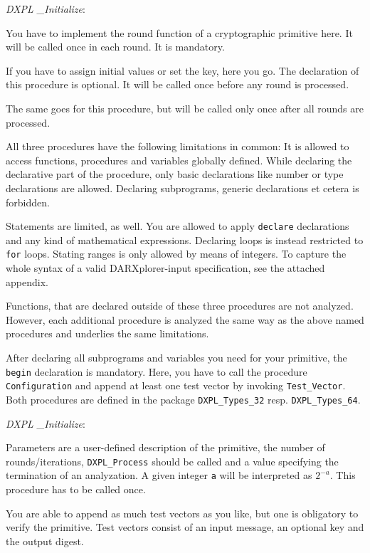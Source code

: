 \documentclass{acmtrans2m}
\begin{document}
\begin{describe}{{\em DXPL \_Initialize\/}:}
\item[{\texttt DXPL\_Process\/}:] You have to implement the round function
of a cryptographic primitive here. It will be called once in each round. It is mandatory.

\item[\texttt{DXPL\_Initialize\/}:] If you have to assign initial values or set the key, here you go. The declaration of this procedure is optional. It will be called once before any round is processed.

\item[\texttt{DXPL\_Finalize\/}:] The same goes for this procedure, but will be called only once after
all rounds are processed.
\end{describe}

All three procedures have the following limitations in common: It is allowed to 
access functions, procedures and variables globally defined. While declaring 
the declarative part of the procedure, only basic declarations like number or 
type declarations are allowed. Declaring subprograms, generic declarations 
et cetera is forbidden.

Statements are limited, as well. You are allowed to apply \texttt{declare} declarations
and any kind of mathematical expressions. Declaring loops is instead restricted
to \texttt{for} loops. Stating ranges is only allowed by means of integers. To capture the whole
syntax of a valid DARXplorer-input specification, see the attached appendix.

Functions, that are declared outside of these three procedures are not analyzed.
However, each additional procedure is analyzed the same way as the above named procedures
and underlies the same limitations.

\bigbreak

After declaring all subprograms and variables you need for your primitive, the \texttt{begin}
declaration is mandatory. Here, you have to call the procedure \texttt{Configu\-ra\-tion} and
append at least one test vector by invoking \texttt{Test\_Vector}. Both procedures are
defined in the package \texttt{DXPL\_Types\_32} resp. \texttt{DXPL\_Types\_64}.

\begin{describe}{{\em DXPL \_Initialize\/}:}
\item[\texttt{Configuration\/}:] Parameters are a user-defined description of the primitive, the number of rounds/iterations, \texttt{DXPL\_Process} should be called and a value specifying the termination
of an analyzation. A given integer \texttt{a} will be interpreted as $2^{-a}$. This procedure has to
be called once.
\item[\texttt{Test\_Vector\/}:] You are able to append as much test vectors as you like, but one
is obligatory to verify the primitive. Test vectors consist of an input message, an optional key and
the output digest.
\end{describe}
\end{document}
